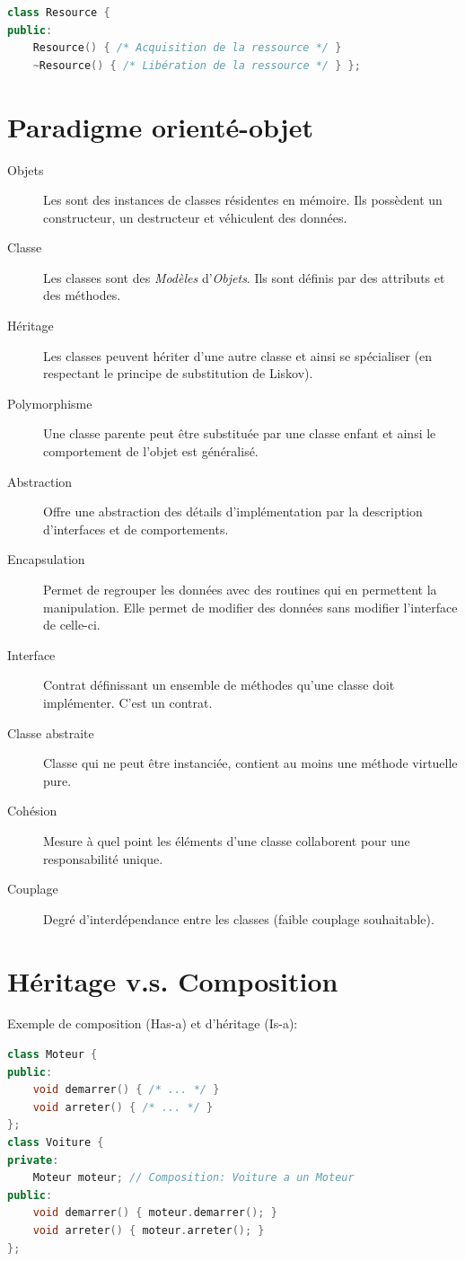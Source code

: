 \documentclass{article}
\begin{document}
\begin{multicols*}{3}
\begin{lstlisting}[language=C++]
class Resource {
public:
    Resource() { /* Acquisition de la ressource */ }
    ~Resource() { /* Libération de la ressource */ } };
\end{lstlisting}

\section*{Paradigme orienté-objet}
\begin{description}
\item[Objets] Les sont des instances de classes résidentes en mémoire. Ils possèdent un constructeur, un destructeur et véhiculent des données.
\item[Classe] Les classes sont des \emph{Modèles} d'\emph{Objets}. Ils sont définis par des attributs et des méthodes.
\item[Héritage] Les classes peuvent hériter d'une autre classe et ainsi se spécialiser (en respectant le principe de substitution de Liskov).
\item[Polymorphisme] Une classe parente peut être substituée par une classe enfant et ainsi le comportement de l'objet est généralisé.
\item[Abstraction] Offre une abstraction des détails d'implémentation par la description d'interfaces et de comportements.
\item[Encapsulation] Permet de regrouper les données avec des routines qui en permettent la manipulation. Elle permet de modifier des données sans modifier l'interface de celle-ci.
\item[Interface] Contrat définissant un ensemble de méthodes qu'une classe doit implémenter. C'est un contrat.
\item[Classe abstraite] Classe qui ne peut être instanciée, contient au moins une méthode virtuelle pure.
\item[Cohésion] Mesure à quel point les éléments d'une classe collaborent pour une responsabilité unique.
\item[Couplage] Degré d'interdépendance entre les classes (faible couplage souhaitable).
\end{description}

\section*{Héritage v.s. Composition}
Exemple de composition (Has-a) et d'héritage (Is-a):
\begin{lstlisting}[language=C++]
class Moteur {
public:
    void demarrer() { /* ... */ }
    void arreter() { /* ... */ }
};
class Voiture {
private:
    Moteur moteur; // Composition: Voiture a un Moteur
public:
    void demarrer() { moteur.demarrer(); }
    void arreter() { moteur.arreter(); }
};


\end{lstlisting}
\end{multicols*}
\end{document}

